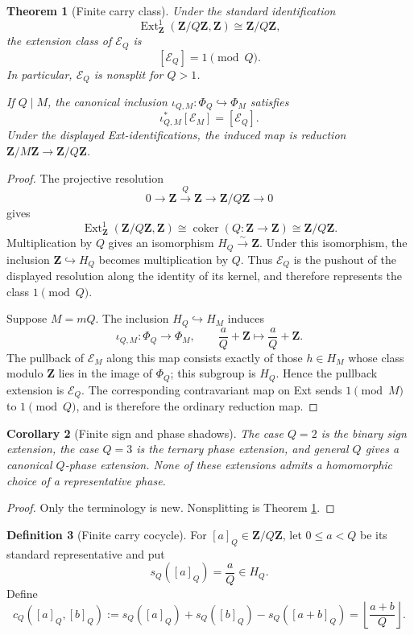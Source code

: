 \documentclass[11pt]{amsart}
\numberwithin{equation}{section}
\newtheorem{theorem}{Theorem}[section]
\newtheorem{corollary}[theorem]{Corollary}
\theoremstyle{definition}
\newtheorem{definition}[theorem]{Definition}
\newcommand{\Z}{\mathbf Z}
\newcommand{\Ext}{\operatorname{Ext}}
\begin{document}
\begin{theorem}[Finite carry class]
\label{thm:finite-carry-class}
Under the standard identification
\[
\Ext^1_{\Z}(\Z/Q\Z,\Z)\cong\Z/Q\Z,
\]
the extension class of $\mathcal E_Q$ is
\[
[\mathcal E_Q]=1\pmod Q.
\]
In particular, $\mathcal E_Q$ is nonsplit for $Q>1$.

If $Q\mid M$, the canonical inclusion
$\iota_{Q,M}:\Phi_Q\hookrightarrow\Phi_M$ satisfies
\[
\iota_{Q,M}^{*}[\mathcal E_M]=[\mathcal E_Q].
\]
Under the displayed Ext-identifications, the induced map is reduction
$\Z/M\Z\to\Z/Q\Z$.
\end{theorem}

\begin{proof}
The projective resolution
\[
0\longrightarrow\Z\xrightarrow{\,Q\,}\Z
\longrightarrow\Z/Q\Z\longrightarrow0
\]
gives
\[
\Ext^1_{\Z}(\Z/Q\Z,\Z)
\cong\operatorname{coker}(Q:\Z\to\Z)
\cong\Z/Q\Z.
\]
Multiplication by $Q$ gives an isomorphism $H_Q\xrightarrow{\sim}\Z$.
Under this isomorphism, the inclusion $\Z\hookrightarrow H_Q$ becomes
multiplication by $Q$.  Thus $\mathcal E_Q$ is the pushout of the displayed
resolution along the identity of its kernel, and therefore represents the
class $1\pmod Q$.

Suppose $M=mQ$.  The inclusion $H_Q\hookrightarrow H_M$ induces
\[
\iota_{Q,M}:\Phi_Q\longrightarrow\Phi_M,
\qquad
\frac aQ+\Z\longmapsto\frac aQ+\Z.
\]
The pullback of $\mathcal E_M$ along this map consists exactly of those
$h\in H_M$ whose class modulo $\Z$ lies in the image of $\Phi_Q$; this
subgroup is $H_Q$.  Hence the pullback extension is $\mathcal E_Q$.
The corresponding contravariant map on Ext sends $1\pmod M$ to
$1\pmod Q$, and is therefore the ordinary reduction map.
\end{proof}

\begin{corollary}[Finite sign and phase shadows]
\label{cor:finite-phase-shadows}
The case $Q=2$ is the binary sign extension, the case $Q=3$ is the
ternary phase extension, and general $Q$ gives a canonical $Q$-phase
extension.  None of these extensions admits a homomorphic choice of a
representative phase.
\end{corollary}

\begin{proof}
Only the terminology is new.  Nonsplitting is Theorem
\ref{thm:finite-carry-class}.
\end{proof}

\begin{definition}[Finite carry cocycle]
\label{def:finite-carry-cocycle}
For $[a]_Q\in\Z/Q\Z$, let $0\leq a<Q$ be its standard representative and
put
\[
s_Q([a]_Q)=\frac aQ\in H_Q.
\]
Define
\[
c_Q([a]_Q,[b]_Q)
:=s_Q([a]_Q)+s_Q([b]_Q)-s_Q([a+b]_Q)
=\left\lfloor\frac{a+b}{Q}\right\rfloor.
\]
\end{definition}
\end{document}
